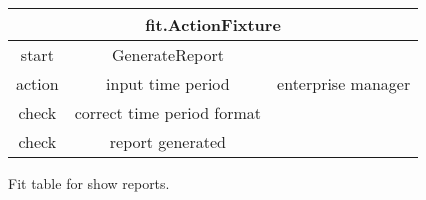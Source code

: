 \begin{figure}[H]
\begin{centering}
\begin{tabular}{|c|c|c|}
\hline \multicolumn{3}{|c|}{fit.ActionFixture} \\
\hline start & GenerateReport &  \\ 
\hline action & input time period & enterprise manager \\ 
\hline check & correct time period format &  \\ 
\hline check & report generated &  \\ 
\hline 
\end{tabular}
\caption{Fit table for show reports.}
\end{centering}
\end{figure}